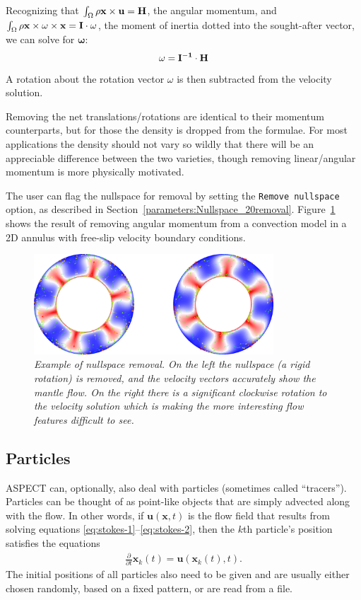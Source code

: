 \documentclass{article}
\newcommand{\aspect}{\textsc{ASPECT}}
\begin{document}
Recognizing that $\int_\Omega \rho {\bf x \times u} = {\bf H}$, the angular momentum, 
and $\int_\Omega \rho {\bf x \times {\mathbf \omega} \times x} = {\bf I \cdot {\mathbf \omega} }$, 
the moment of inertia dotted into the sought-after vector, we can solve for ${\mathbf \omega}$: 
\begin{equation*}
{\mathbf \omega} = {\bf I^{-1} \cdot H}
\end{equation*}
A rotation about the rotation vector $\omega$ is then subtracted from the velocity solution.

Removing the net translations/rotations are identical to their momentum counterparts, but for those the 
density is dropped from the formulae. For most applications the density should not vary so wildly 
that there will be an appreciable difference between the two varieties, 
though removing linear/angular momentum is more physically motivated.

The user can flag the nullspace for removal by setting the \texttt{Remove nullspace} option,
as described in Section~\ref{parameters:Nullspace_20removal}.
Figure~\ref{fig:rigid_rotation} shows the result of removing angular momentum from a convection 
model in a 2D annulus with free-slip velocity boundary conditions. 

\begin{figure}[tbp]
  \centering
  \includegraphics[width=0.8\textwidth]{rigid_rotation.png}
  \caption{\it Example of nullspace removal. 
On the left the nullspace (a rigid rotation) is removed, and the velocity vectors accurately 
show the mantle flow. On the right there is a significant clockwise rotation to the velocity 
solution which is making the more interesting flow features difficult to see. }
  \label{fig:rigid_rotation}
\end{figure}


\subsection{Particles}
\label{sec:particles}

\aspect{} can, optionally, also deal with particles (sometimes called
``tracers''). Particles can be thought of as point-like objects that are simply
advected along with the flow. In other words, if $\mathbf u(\mathbf x,t)$ is the
flow field that results from solving equations
\eqref{eq:stokes-1}--\eqref{eq:stokes-2}, then the $k$th particle's position
satisfies the equations
\begin{align}
  \frac{\partial}{\partial t} \mathbf x_k(t)
  = \mathbf u(\mathbf x_k(t),t).
\end{align}
The initial positions of all particles also need to be given and are usually
either chosen randomly, based on a fixed pattern, or are read from a file.
\end{document}
